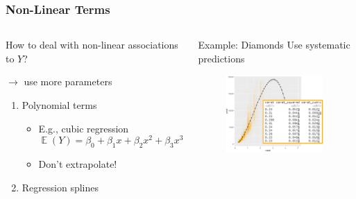 \documentclass[
    utf8,
    aspectratio=169
]{beamer}  %
\DeclareMathOperator{\E}{\mathbb{E}}  %
\begin{document}
\begin{frame}
\frametitle{Non-Linear Terms}
\begin{columns}
	\begin{block}{How to deal with non-linear associations to $Y$?}
		
		$\rightarrow$ use more parameters
	\begin{enumerate}
		\item Polynomial terms
		\begin{itemize}
			\item E.g., cubic regression
			$$
				\E(Y) = \beta_0 + \beta_1 x + \beta_2 x^2 + \beta_3 x^3
			$$
			\item Don't extrapolate!
		\end{itemize}
		\item Regression splines
	\end{enumerate}
	\end{block}
	
	\begin{block}{Example: Diamonds}
		Use systematic predictions
		\begin{figure}
			\includegraphics[width=0.95\textwidth]{pics/nonlinear.png}
		\end{figure}
	\end{block}
\end{columns}
\end{frame}
\end{document}

